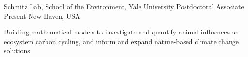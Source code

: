 

\begin{cventries}

  \cventry
    {Schmitz Lab, School of the Environment, Yale University} %
    {Postdoctoral Associate} %
    {Present} %
    {New Haven, USA} %
    {
      \begin{cvitems} %
        \item {Building mathematical models to investigate and quantify animal influences on ecosystem carbon cycling, and inform and expand nature-based climate change solutions}
      \end{cvitems} 
    }
\end{cventries}
